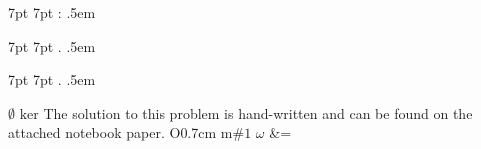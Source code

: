 \usepackage{amsmath}
\usepackage{amssymb}
\usepackage{amsthm}
\usepackage{bm}
\usepackage{enumitem}
\usepackage{graphicx}
\usepackage{mathrsfs}  %
\usepackage{mathtools}
\usepackage{parskip}
\usepackage{xparse}


\newtheorem{theorem}{Theorem}[section]
\newtheorem{corollary}{Corollary}[theorem]
\newtheorem{lemma}{Lemma}

%
   {7pt}%
   {7pt}%
   {}%
   {}%
   {\bfseries}%
   {:}%
   {.5em}%
   {}

%
   {7pt}%
   {7pt}%
   {}%
   {}%
   {\bfseries}%
   {.}%
   {.5em}%
   {}

%
   {7pt}%
   {7pt}%
   {}%
   {}%
   {\itshape}%
   {.}%
   {.5em}%
   {}

\theoremstyle{case}
\newtheorem{case}{Case}

\theoremstyle{claim}
\newtheorem*{claim}{Claim}

\theoremstyle{remark}
\newtheorem*{remark}{Remark}

\makeatletter
\newcommand*{\declarecommand}{%
    \@star@or@long\declare@command
}
\newcommand*{\declare@command}[1]{%
    \provide@command{#1}{}%
    \RenewDocumentCommand{#1}%
}
\makeatother

\renewcommand{\a}{\alpha}
\newcommand{\Bythrm}[1]{By Theorem #1 of the text}
\renewcommand{\b}{\beta}
\newcommand{\bythrm}[1]{by Theorem #1 of the text}
\newcommand{\C}{\mathbb{C}}
\newcommand{\cC}{\mathcal{C}}
\newcommand{\cN}{\mathcal{N}}
\newcommand{\cR}{\mathcal{R}}
\newcommand{\cQ}{\mathcal{Q}}
\newcommand{\cZ}{\mathcal{Z}}
\renewcommand{\cal}[1]{\mathcal{#1}}
\newcommand{\com}[1]{\text{\scriptsize(#1)}}
\renewcommand{\d}{\delta}
\newcommand{\e}{\ensuremath{\epsilon}}
\declarecommand{\es}{}{\ensuremath{\emptyset}}
\newcommand{\h}[1]{\ensuremath{\hat{#1}}}
\renewcommand{\l}{\ell}
\declarecommand{\ker}{}{\ensuremath{\text{ker}}}
\newcommand{\la}{\leftarrow}
\newcommand{\N}{\mathbb{N}}
\declarecommand{\nb}{}{The solution to this problem is hand-written and can be found on the attached notebook paper.}
\declarecommand{\novs}{O{0.7cm}}{\vspace{-#1}}
\newcommand\numberthis{\addtocounter{equation}{1}\tag{\theequation}}
\newcommand{\R}{\mathbb{R}}
\newcommand{\ra}{\rightarrow}
\newcommand{\s}[1]{\ensuremath{\{#1\}}}
\newcommand{\set}[1]{\ensuremath{\{#1\}}}
\newcommand{\seq}[1]{\left\{#1\right\}_{n=1}^{\infty}}
\newcommand{\struct}[1]{\langle #1 \rangle}
\newcommand{\st}[1]{\ensuremath{\langle #1 \rangle}}
\newcommand{\sub}{\ensuremath{\subset}}
\newcommand{\sube}{\ensuremath{\subseteq}}
\renewcommand{\t}{\theta}
\declarecommand{\tx}{m}{\ensuremath{\text{#1}}}
\newcommand{\vphi}{\varphi}
\declarecommand{\w}{}{\ensuremath{\omega}}
\newcommand{\Q}{\mathbb{Q}}
\newcommand{\Z}{\mathbb{Z}}
\declarecommand{\=}{}{&=}
